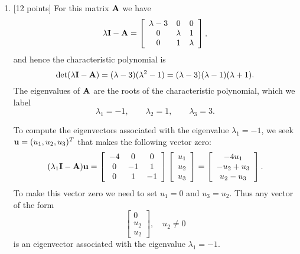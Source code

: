\begin{solution}
\begin{enumerate}
\item {[12 points]} For this matrix ${\bf A}$ we have
\[ \lambda{\bf I} - {\bf A} = \left[\begin{array}{ccc}\lambda-3 & 0 & 0 \\ 0 & \lambda & 1 \\ 0 & 1 & \lambda\end{array}\right],\]
and hence the characteristic polynomial is 
\[ \det(\lambda{\bf I} - {\bf A}) = (\lambda-3)(\lambda^2 - 1) = (\lambda-3)(\lambda-1)(\lambda+1).\]
The eigenvalues of ${\bf A}$ are the roots of the characteristic polynomial, which we label
\[ \lambda_1 = -1, \qquad
   \lambda_2 = 1, \qquad
   \lambda_3 = 3.\]

To compute the eigenvectors associated with the eigenvalue $\lambda_1=-1$, we seek ${\bf u} = (u_1, u_2, u_3)^T$ that makes the following vector zero:
\[ (\lambda_1 {\bf I}-{\bf A}) {\bf u} = \left[\begin{array}{ccc}-4 & 0 & 0 \\ 0 & -1 & 1 \\ 0 & 1 & -1\end{array}\right]
                             \left[\begin{array}{c}u_1 \\ u_2\\ u_3\end{array}\right]
                           = \left[\begin{array}{c}-4u_1 \\ -u_2+u_3 \\ u_2-u_3\end{array}\right].\]
To make this vector zero we need to set $u_1 = 0$ and $u_3 = u_2$.
Thus any vector of the form
\[ \left[\begin{array}{c}0 \\ u_2 \\ u_2\end{array}\right], \quad u_2 \ne 0\]
is an eigenvector associated with the eigenvalue $\lambda_1=-1$.


\end{enumerate}
\end{solution}
